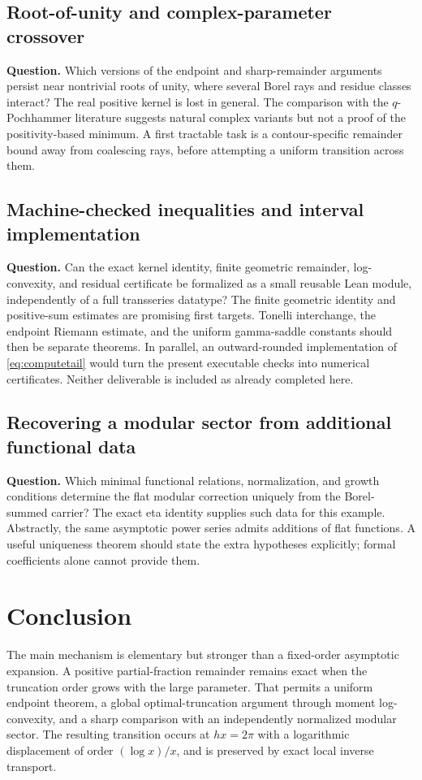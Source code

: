 \documentclass[11pt,a4paper]{article}
\theoremstyle{definition}
\theoremstyle{remark}
\begin{document}
\subsection{Root-of-unity and complex-parameter crossover}
\textbf{Question.} Which versions of the endpoint and sharp-remainder
arguments persist near nontrivial roots of unity, where several Borel rays
and residue classes interact?
The real positive kernel is lost in general. The comparison with the
$q$-Pochhammer literature \cite{garoufalidiskashaev,fantinirella} suggests
natural complex variants but not a proof of the positivity-based minimum.
A first tractable task is a contour-specific remainder bound away from
coalescing rays, before attempting a uniform transition across them.

\subsection{Machine-checked inequalities and interval implementation}
\textbf{Question.} Can the exact kernel identity, finite geometric remainder,
log-convexity, and residual certificate be formalized as a small reusable
Lean module, independently of a full transseries datatype?
The finite geometric identity and positive-sum estimates are promising
first targets. Tonelli interchange, the endpoint Riemann estimate, and the
uniform gamma-saddle constants should then be separate theorems. In
parallel, an outward-rounded implementation of \eqref{eq:computetail}
would turn the present executable checks into numerical certificates.
Neither deliverable is included as already completed here.

\subsection{Recovering a modular sector from additional functional data}
\textbf{Question.} Which minimal functional relations, normalization, and
growth conditions determine the flat modular correction uniquely from the
Borel-summed carrier?
The exact eta identity supplies such data for this example. Abstractly,
the same asymptotic power series admits additions of flat functions.
A useful uniqueness theorem should state the extra hypotheses explicitly;
formal coefficients alone cannot provide them.

\section{Conclusion}
The main mechanism is elementary but stronger than a fixed-order
asymptotic expansion. A positive partial-fraction remainder remains exact
when the truncation order grows with the large parameter. That permits a
uniform endpoint theorem, a global optimal-truncation argument through
moment log-convexity, and a sharp comparison with an independently
normalized modular sector. The resulting transition occurs at $hx=2\pi$
with a logarithmic displacement of order $(\log x)/x$, and is preserved by
exact local inverse transport.
\end{document}
